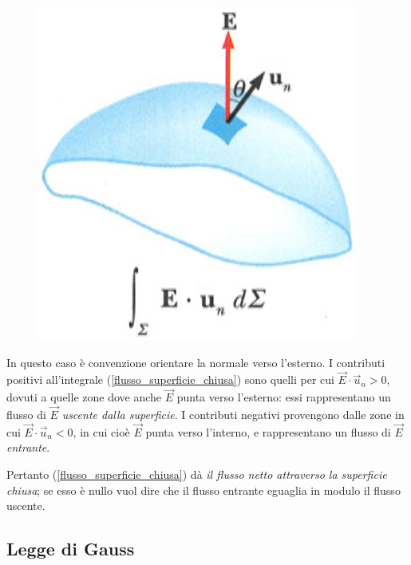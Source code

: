 \documentclass[class=book, crop=false, oneside, 12pt]{standalone}
\begin{document}
\begin{figure}[h]
    \includegraphics[scale=0.4]{flusso_superficie_orientata.png}
    \centering
    \caption{}
\end{figure}

In questo caso è convenzione orientare la normale verso l'esterno. 
I contributi positivi all'integrale (\ref{flusso_superficie_chiusa}) sono quelli per cui \(\overrightarrow{E} \cdot \overrightarrow{u}_n> 0\), dovuti a quelle zone dove anche \(\overrightarrow{E}\) punta verso l'esterno: essi rappresentano un flusso di \(\overrightarrow{E}\) \emph{uscente dalla superficie}. 
I contributi negativi provengono dalle zone in cui \(\overrightarrow{E} \cdot \overrightarrow{u}_n < 0\), in cui cioè \(\overrightarrow{E}\) punta verso l'interno, e rappresentano un flusso di \(\overrightarrow{E}\) \emph{entrante}. 

Pertanto (\ref{flusso_superficie_chiusa}) dà \emph{il flusso netto attraverso la superficie chiusa}; se esso è nullo vuol dire che il flusso entrante eguaglia in modulo il flusso uscente.

\subsection{Legge di Gauss}
\end{document}
